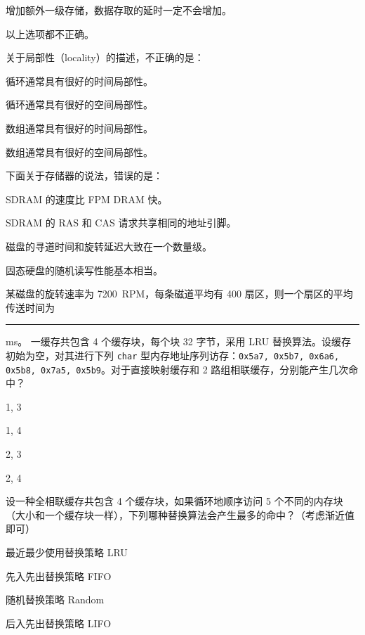 \begin{problems}
\begin{choices}
            \item 增加额外一级存储，数据存取的延时一定不会增加。
            \item 以上选项都不正确。
        \end{choices}
         关于局部性（locality）的描述，不正确的是：
        \begin{choices}
            \item 循环通常具有很好的时间局部性。
            \item 循环通常具有很好的空间局部性。
            \item 数组通常具有很好的时间局部性。
            \item 数组通常具有很好的空间局部性。
        \end{choices}
         下面关于存储器的说法，错误的是：
        \begin{choices}
            \item SDRAM 的速度比 FPM DRAM 快。
            \item SDRAM 的 RAS 和 CAS 请求共享相同的地址引脚。
            \item 磁盘的寻道时间和旋转延迟大致在一个数量级。
            \item 固态硬盘的随机读写性能基本相当。
        \end{choices}
         某磁盘的旋转速率为 \SI{7200}{RPM}，每条磁道平均有 400 扇区，则一个扇区的平均传送时间为 \rule{2.5cm}{0.25mm} ms。
         一缓存共包含 4 个缓存块，每个块 32 字节，采用 LRU 替换算法。设缓存初始为空，对其进行下列 \verb|char| 型内存地址序列访存：\verb|0x5a7, 0x5b7, 0x6a6, 0x5b8, 0x7a5, 0x5b9|。对于直接映射缓存和 2 路组相联缓存，分别能产生几次命中？
        \begin{choices}
            \item 1, 3
            \item 1, 4
            \item 2, 3
            \item 2, 4
        \end{choices}
         设一种全相联缓存共包含 4 个缓存块，如果循环地顺序访问 5 个不同的内存块（大小和一个缓存块一样），下列哪种替换算法会产生最多的命中？（考虑渐近值即可）
        \begin{choices}
            \item 最近最少使用替换策略 LRU
            \item 先入先出替换策略 FIFO
            \item 随机替换策略 Random
            \item 后入先出替换策略 LIFO

\end{choices}
\end{problems}

